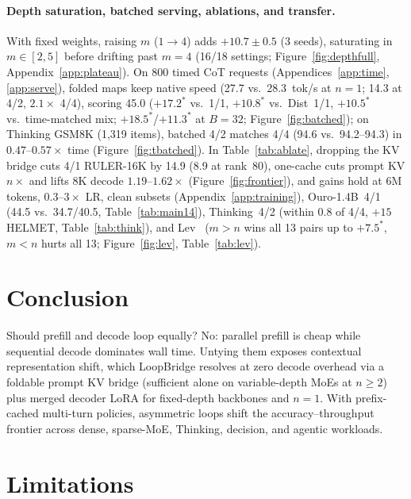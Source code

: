 \documentclass[11pt]{article}
\begin{document}
\paragraph{Depth saturation, batched serving, ablations, and transfer.}
\label{sec:others}
With fixed weights, raising $m$ ($1{\to}4$) adds $+10.7{\pm}0.5$ (3 seeds), saturating in $m\in[2,5]$ before drifting
past $m{=}4$ (16/18 settings; Figure~\ref{fig:depthfull}, Appendix~\ref{app:plateau}). On 800 timed CoT requests
(Appendices~\ref{app:time}, \ref{app:serve}), folded maps keep native speed (27.7 vs.\ 28.3~\mbox{tok/s} at $n{=}1$;
14.3 at 4/2, $2.1\times$ 4/4), scoring 45.0 ($+17.2^\ast$ vs.\ 1/1, $+10.8^\ast$ vs.\ Dist~1/1, $+10.5^\ast$ vs.\
time-matched mix; $+18.5^\ast$/$+11.3^\ast$ at $B{=}32$; Figure~\ref{fig:batched}); on Thinking GSM8K (1,319 items),
batched 4/2 matches 4/4 (94.6 vs.\ 94.2--94.3) in $0.47$--$0.57\times$ time (Figure~\ref{fig:tbatched}). In
Table~\ref{tab:ablate}, dropping the KV bridge cuts 4/1 RULER-16K by 14.9 (8.9 at rank~80), one-cache cuts prompt KV
$n\times$ and lifts 8K decode $1.19$--$1.62\times$ (Figure~\ref{fig:frontier}), and gains hold at 6M tokens,
$0.3$--$3\times$ LR, clean subsets (Appendix~\ref{app:training}), Ouro-1.4B~4/1 (44.5 vs.\ 34.7/40.5,
Table~\ref{tab:main14}), Thinking~4/2 (within 0.8 of 4/4, $+15$ HELMET, Table~\ref{tab:think}), and Lev~\citep{lev}
($m{>}n$ wins all 13 pairs up to $+7.5^\ast$, $m{<}n$ hurts all 13; Figure~\ref{fig:lev}, Table~\ref{tab:lev}).

\section{Conclusion}

Should prefill and decode loop equally? No: parallel prefill is cheap while sequential decode dominates wall time.
Untying them exposes contextual representation shift, which LoopBridge resolves at zero decode overhead via a foldable
prompt KV bridge (sufficient alone on variable-depth MoEs at $n{\ge}2$) plus merged decoder LoRA for fixed-depth
backbones and $n{=}1$. With prefix-cached multi-turn policies, asymmetric loops shift the accuracy--throughput frontier
across dense, sparse-MoE, Thinking, decision, and agentic workloads.

\section*{Limitations}
\label{sec:limits}
\end{document}
